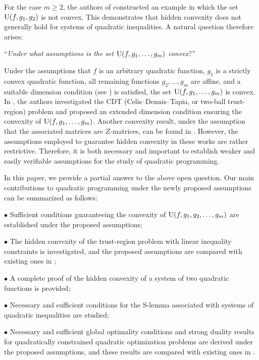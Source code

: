 \documentclass[]{interact}
\theoremstyle{plain}%
\theoremstyle{definition}
\theoremstyle{remark}
\begin{document}
	For the case $m\geq 2$, the authors of \cite[Example 2.1]{JeyakumarLi2014} constructed an example in which the set
	${\rm U}(f,g_1,g_2)$ is not convex.
	This demonstrates that hidden convexity does not generally hold for systems of quadratic inequalities.
	A natural question therefore arises:
	
	``{\it Under what assumptions is the set ${\rm U}(f,g_1,\ldots,g_m)$ convex}?''
	
	Under the assumptions that $f$ is an arbitrary quadratic function, $g_1$ is a strictly convex quadratic function,
	all remaining functions $g_2,\ldots,g_m$ are affine, and a suitable dimension condition
	(see \cite{JeyakumarLi2014}) is satisfied, the set ${\rm U}(f,g_1,\ldots,g_m)$ is convex.
	In \cite{BomzeJeyakumarLi2018}, the authors investigated the CDT (Celis--Dennis--Tapia, or two-ball trust-region) problem
	and proposed an extended dimension condition ensuring the convexity of ${\rm U}(f,g_1,\ldots,g_m)$.
	Another convexity result, under the assumption that the associated matrices are $Z$-matrices,
	can be found in \cite{JeyakumarLeeLi2009}.
	However, the assumptions employed to guarantee hidden convexity in these works are rather restrictive.
	Therefore, it is both necessary and important to establish weaker and easily verifiable assumptions
	for the study of quadratic programming.
	
	
	
	In this paper, we provide a partial answer to the above open question.
	Our main contributions to quadratic programming under the newly proposed assumptions
	can be summarized as follows:
	
	$\bullet$ Sufficient conditions guaranteeing the convexity of
	${\rm U}(f,g_1,g_2,\ldots,g_m)$ are established under the proposed assumptions;
	
	$\bullet$ The hidden convexity of the trust-region problem with linear inequality constraints
	is investigated, and the proposed assumptions are compared with existing ones in
	\cite{BomzeJeyakumarLi2018,JeyakumarLi2014,Polyak1998};
	
	$\bullet$ A complete proof of the hidden convexity of a system of two quadratic functions
	is provided;
	
	$\bullet$ Necessary and sufficient conditions for the S-lemma associated with systems of quadratic inequalities
	are studied;
	
	$\bullet$ Necessary and sufficient global optimality conditions and strong duality results
	for quadratically constrained quadratic optimization problems are derived under the proposed assumptions,
	and these results are compared with existing ones in
	\cite{BomzeJeyakumarLi2018,JeyakumarLi2014,Tuy2016,TuyTuan2013}.
	
\end{document}
